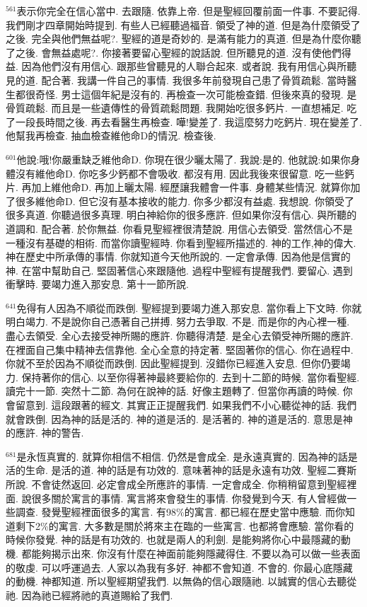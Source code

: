 \documentclass{book}
\begin{document}
$^{561}$表示你完全在信心當中.
去跟隨.
依靠上帝.
但是聖經回覆前面一件事.
不要記得.
我們剛才四章開始時提到.
有些人已經聽過福音.
領受了神的道.
但是為什麼領受了之後.
完全與他們無益呢?.
聖經的道是奇妙的.
是滿有能力的真道.
但是為什麼你聽了之後.
會無益處呢?.
你接著要留心聖經的說話說.
但所聽見的道.
沒有使他們得益.
因為他們沒有用信心.
跟那些曾聽見的人聯合起來.
或者說.
我有用信心與所聽見的道.
配合著.
我講一件自己的事情.
我很多年前發現自己患了骨質疏鬆.
當時醫生都很奇怪.
男士這個年紀是沒有的.
再檢查一次可能檢查錯.
但後來真的發現.
是骨質疏鬆.
而且是一些遺傳性的骨質疏鬆問題.
我開始吃很多鈣片.
一直想補足.
吃了一段長時間之後.
再去看醫生再檢查.
嘩!變差了.
我這麼努力吃鈣片.
現在變差了.
他幫我再檢查.
抽血檢查維他命D的情況.
檢查後.

$^{601}$他說:哦!你嚴重缺乏維他命D.
你現在很少曬太陽了.
我說:是的.
他就說:如果你身體沒有維他命D.
你吃多少鈣都不會吸收.
都沒有用.
因此我後來很留意.
吃一些鈣片.
再加上維他命D.
再加上曬太陽.
經歷讓我體會一件事.
身體某些情況.
就算你加了很多維他命D.
但它沒有基本接收的能力.
你多少都沒有益處.
我想說.
你領受了很多真道.
你聽過很多真理.
明白神給你的很多應許.
但如果你沒有信心.
與所聽的道調和.
配合著.
於你無益.
你看見聖經裡很清楚說.
用信心去領受.
當然信心不是一種沒有基礎的相術.
而當你讀聖經時.
你看到聖經所描述的.
神的工作,神的偉大.
神在歷史中所承傳的事情.
你就知道今天他所說的.
一定會承傳.
因為他是信實的神.
在當中幫助自己.
堅固著信心來跟隨他.
過程中聖經有提醒我們.
要留心.
遇到衝擊時.
要竭力進入那安息.
第十一節所說.

$^{641}$免得有人因為不順從而跌倒.
聖經提到要竭力進入那安息.
當你看上下文時.
你就明白竭力.
不是說你自己憑著自己拼搏.
努力去爭取.
不是.
而是你的內心裡一種.
盡心去領受.
全心去接受神所賜的應許.
你聽得清楚.
是全心去領受神所賜的應許.
在裡面自己集中精神去信靠他.
全心全意的持定著.
堅固著你的信心.
你在過程中.
你就不至於因為不順從而跌倒.
因此聖經提到.
沒錯你已經進入安息.
但你仍要竭力.
保持著你的信心.
以至你得著神最終要給你的.
去到十二節的時候.
當你看聖經.
讀完十一節.
突然十二節.
為何在說神的話.
好像主題轉了.
但當你再讀的時候.
你會留意到.
這段跟著的經文.
其實正正提醒我們.
如果我們不小心聽從神的話.
我們就會跌倒.
因為神的話是活的.
神的道是活的.
是活著的.
神的道是活的.
意思是神的應許.
神的警告.

$^{681}$是永恆真實的.
就算你相信不相信.
仍然是會成全.
是永遠真實的.
因為神的話是活的生命.
是活的道.
神的話是有功效的.
意味著神的話是永遠有功效.
聖經二賽斯所說.
不會徒然返回.
必定會成全所應許的事情.
一定會成全.
你稍稍留意到聖經裡面.
說很多關於寓言的事情.
寓言將來會發生的事情.
你發覺到今天.
有人曾經做一些調查.
發覺聖經裡面很多的寓言.
有98\%的寓言.
都已經在歷史當中應驗.
而你知道剩下2\%的寓言.
大多數是關於將來主在臨的一些寓言.
也都將會應驗.
當你看的時候你發覺.
神的話是有功效的.
也就是兩人的利劍.
是能夠將你心中最隱藏的動機.
都能夠揭示出來.
你沒有什麼在神面前能夠隱藏得住.
不要以為可以做一些表面的敬虔.
可以呼運過去.
人家以為我有多好.
神都不會知道.
不會的.
你最心底隱藏的動機.
神都知道.
所以聖經期望我們.
以無偽的信心跟隨祂.
以誠實的信心去聽從祂.
因為祂已經將祂的真道賜給了我們.
\end{document}
